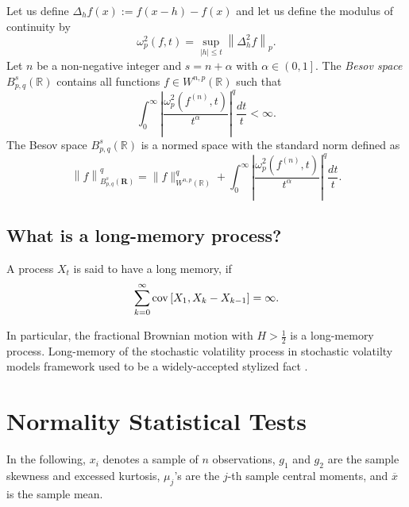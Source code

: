     \begin{definition}
        Let us define $\Delta _{h}f(x):=f(x-h)-f(x)$ and let us define the modulus of continuity by
        \begin{equation}
            \omega _{p}^{2}(f,t)=\sup _{|h|\leq t}\left\|\Delta _{h}^{2}f\right\|_{p}.
        \end{equation}
        Let $n$ be a non-negative integer and $s = n + \alpha$ with $\alpha \in \left(0, 1\right]$. 
        The \emph{Besov space} $B^{s}_{p,q}(\mathbb{R})$ contains all functions $f\in W^{n, p}(\mathbb{R})$ such that
        \begin{equation}
            \int_0^\infty \left|\frac{ \omega^2_p (f^{(n)}, t)} {t^{\alpha} }\right|^q \frac{dt}{t} < \infty.
        \end{equation}
        The Besov space $B_{p,q}^{s}(\mathbb{R})$ is a normed space with the standard norm defined as
        \begin{equation}
            \left\|f\right\|_{B_{p,q}^{s}(\mathbf {R} )}^q=\|f\|_{W^{n,p}(\mathbb {R} )}^{q}+\int _{0}^{\infty }\left|{\frac {\omega _{p}^{2}(f^{(n)}, t)}{t^{\alpha }}}\right|^{q}{\frac {dt}{t}}.
        \end{equation}
    \end{definition}

    \subsection{What is a long-memory process?}
        \begin{definition}
            A process $X_t$ is said to have a long memory, if 
            \begin{equation}
                \sum_{k=0}^{\infty}\operatorname*{cov}\left[X_1 , X_{k} - X_{k-1}\right] = \infty.
            \end{equation}
        \end{definition}

        In particular, the fractional Brownian motion with $H > \frac{1}{2}$ is a long-memory process.
        Long-memory of the stochastic volatility process in stochastic volatilty models framework used to be a 
        widely-accepted stylized fact \cite{Breidt1998,ComteRenault1998,Comte1996,Ding1993}.

\section{Normality Statistical Tests}\label{sec:statisticaltest}
    In the following, $x_i$ denotes a sample of $n$ observations, $g_1$ and $g_2$ are the sample 
    skewness and excessed kurtosis, $\mu_j$'s are the $j$-th sample central moments, and $\overline{x}$ is the 
    sample mean. 

